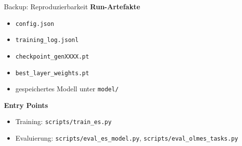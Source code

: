 \documentclass[aspectratio=169,11pt]{beamer}
\begin{document}
\begin{frame}{Backup: Reproduzierbarkeit}
\textbf{Run-Artefakte}
\begin{itemize}
  \item \texttt{config.json}
  \item \texttt{training\_log.jsonl}
  \item \texttt{checkpoint\_genXXXX.pt}
  \item \texttt{best\_layer\_weights.pt}
  \item gespeichertes Modell unter \texttt{model/}
\end{itemize}

\textbf{Entry Points}
\begin{itemize}
  \item Training: \texttt{scripts/train\_es.py}
  \item Evaluierung: \texttt{scripts/eval\_es\_model.py}, \texttt{scripts/eval\_olmes\_tasks.py}
\end{itemize}
\end{frame}
\end{document}
